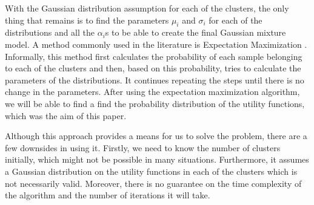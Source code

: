 With the Gaussian distribution assumption for each of the clusters, the only thing that remains is to find the parameters $\mu_i$ and $\sigma_i$ for each of the distributions and all the $\alpha_i$s to be able to create the final Gaussian mixture model. A method commonly used in the literature is Expectation Maximization \cite{ML}. Informally, this method first calculates the probability of each sample belonging to each of the clusters and then, based on this probability, tries to calculate the parameters of the distributions. It continues repeating the steps until there is no change in the parameters. After using the expectation maximization algorithm, we will be able to find a find the probability distribution of the utility functions, which was the aim of this paper. 

Although this approach provides a means for us to solve the problem, there are a few downsides in using it. Firstly, we need to know the number of clusters initially, which might not be possible in many situations. Furthermore, it assumes a Gaussian distribution on the utility functions in each of the clusters which is not necessarily valid. Moreover, there is no guarantee on the time complexity of the algorithm and the number of iterations it will take. 

